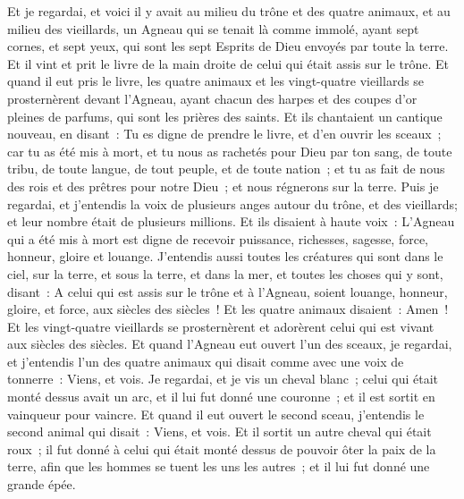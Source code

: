 \begin{multicols}{2}
Et je regardai, et voici il y avait au milieu du trône et des quatre animaux, et au milieu des vieillards, un Agneau qui se tenait là comme immolé, ayant sept cornes, et sept yeux, qui sont les sept Esprits de Dieu envoyés par toute la terre.
Et il vint et prit le livre de la main droite de celui qui était assis sur le trône.
Et quand il eut pris le livre, les quatre animaux et les vingt-quatre vieillards se prosternèrent devant l'Agneau, ayant chacun des harpes et des coupes d'or pleines de parfums, qui sont les prières des saints.
Et ils chantaient un cantique nouveau, en disant~: Tu es digne de prendre le livre, et d'en ouvrir les sceaux~; car tu as été mis à mort, et tu nous as rachetés pour Dieu par ton sang, de toute tribu, de toute langue, de tout peuple, et de toute nation~;
et tu as fait de nous des rois et des prêtres pour notre Dieu~; et nous régnerons sur la terre.
Puis je regardai, et j'entendis la voix de plusieurs anges autour du trône, et des vieillards; et leur nombre était de plusieurs millions.
Et ils disaient à haute voix~: L'Agneau qui a été mis à mort est digne de recevoir puissance, richesses, sagesse, force, honneur, gloire et louange.
J'entendis aussi toutes les créatures qui sont dans le ciel, sur la terre, et sous la terre, et dans la mer, et toutes les choses qui y sont, disant~: A celui qui est assis sur le trône et à l'Agneau, soient louange, honneur, gloire, et force, aux siècles des siècles~!
Et les quatre animaux disaient~: Amen~! Et les vingt-quatre vieillards se prosternèrent et adorèrent celui qui est vivant aux siècles des siècles.
\VerseOne{}Et quand l'Agneau eut ouvert l'un des sceaux, je regardai, et j'entendis l'un des quatre animaux qui disait comme avec une voix de tonnerre~: Viens, et vois.
Je regardai, et je vis un cheval blanc~; celui qui était monté dessus avait un arc, et il lui fut donné une couronne~; et il est sortit en vainqueur pour vaincre.
Et quand il eut ouvert le second sceau, j'entendis le second animal qui disait~: Viens, et vois.
Et il sortit un autre cheval qui était roux~; il fut donné à celui qui était monté dessus de pouvoir ôter la paix de la terre, afin que les hommes se tuent les uns les autres~; et il lui fut donné une grande épée.

\end{multicols}
